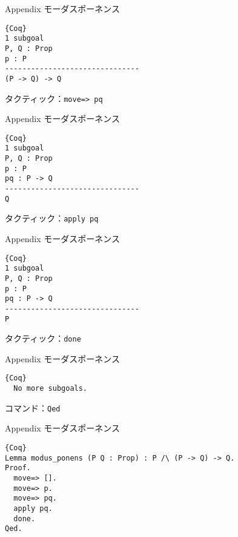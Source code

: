 \documentclass[dvipdfmx,cjk]{beamer}
\theoremstyle{mystyle}
\newcommand{\0}{\textbf{0}}
\begin{document}
\begin{frame}[fragile]{Appendix モーダスポーネンス}
	\begin{screen}
	  \begin{lstlisting}{Coq}
1 subgoal
P, Q : Prop
p : P
-------------------------------
(P -> Q) -> Q \end{lstlisting}
	\end{screen} \pause
	タクティック：{\tt move=> pq}
\end{frame}

\begin{frame}[fragile]{Appendix モーダスポーネンス}
	\begin{screen}
	  \begin{lstlisting}{Coq}
1 subgoal
P, Q : Prop
p : P
pq : P -> Q
-------------------------------
Q \end{lstlisting}
	\end{screen} \pause
	タクティック：{\tt apply pq}
\end{frame}

\begin{frame}[fragile]{Appendix モーダスポーネンス}
	\begin{screen}
	  \begin{lstlisting}{Coq}
1 subgoal
P, Q : Prop
p : P
pq : P -> Q
-------------------------------
P \end{lstlisting}
	\end{screen} \pause
	タクティック：{\tt done}
\end{frame}

\begin{frame}[fragile]{Appendix モーダスポーネンス}
	\begin{screen}
	  \begin{lstlisting}{Coq}
  No more subgoals. \end{lstlisting}
	\end{screen} \pause
	コマンド：{\tt Qed}
\end{frame}

\begin{frame}[fragile]{Appendix モーダスポーネンス}
	\begin{lstlisting}{Coq}
Lemma modus_ponens (P Q : Prop) : P /\ (P -> Q) -> Q.
Proof.
  move=> [].
  move=> p.
  move=> pq.
  apply pq.
  done.
Qed. \end{lstlisting}
\end{frame}
\end{document}
